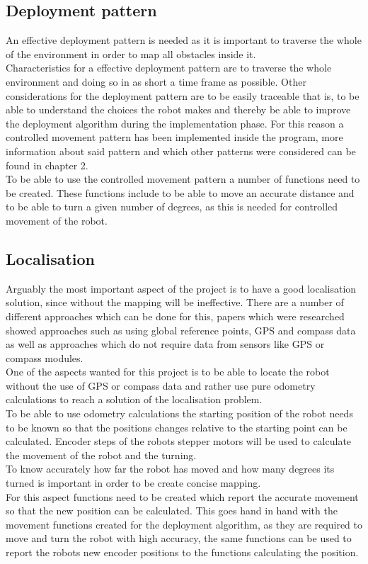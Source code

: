 \subsection{Deployment pattern}
An effective deployment pattern is needed as it is important to traverse the whole of the environment in order to map all obstacles inside it.\\
Characteristics for a effective deployment pattern are to traverse the whole environment and doing so in as short a time frame as possible. Other considerations for the deployment pattern are to be easily traceable that is, to be able to understand the choices the robot makes and thereby be able to improve the deployment algorithm during the implementation phase. For this reason a controlled movement pattern has been implemented inside the program, more information about said pattern and which other patterns were considered can be found in chapter 2. \\
To be able to use the controlled movement pattern a number of functions need to be created. 
These functions include to be able to move an accurate distance and to be able to turn a given number of degrees, as this is needed for controlled movement of the robot. 

\subsection{Localisation}
Arguably the most important aspect of the project is to have a good localisation solution, since without the mapping will be ineffective. There are a number of different approaches which can be done for this, papers which were researched showed approaches such as using global reference points\cite{Dissanayake2001Solution, Thrun2000Realtime}, GPS and compass data as well as approaches which do not require data from sensors like GPS or compass modules\cite{Poduri2004Constrained}.\\
One of the aspects wanted for this project is to be able to locate the robot without the use of GPS or compass data and rather use pure odometry calculations to reach a solution of the localisation problem.\\[3ex]

To be able to use odometry calculations the starting position of the robot needs to be known so that the positions changes relative to the starting point can be calculated. Encoder steps of the robots stepper motors will be used to calculate the movement of the robot and the turning. \\
To know accurately how far the robot has moved and how many degrees its turned is important in order to be create concise mapping. \\
For this aspect functions need to be created which report the accurate movement so that the new position can be calculated. This goes hand in hand with the movement functions created for the deployment algorithm, as they are required to move and turn the robot with high accuracy, the same functions can be used to report the robots new encoder positions to the functions calculating the position. 

